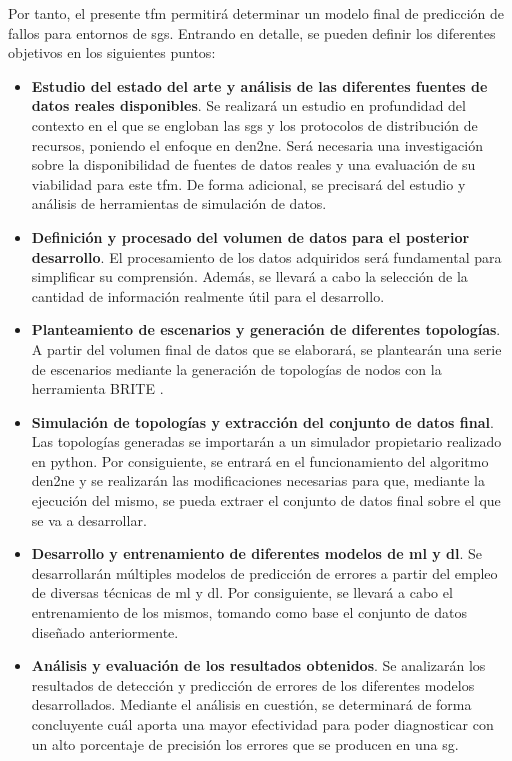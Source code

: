 \vspace{3mm}

\pagebreak

Por tanto, el presente \gls{tfm} permitirá determinar un modelo final de predicción de fallos para entornos de \gls{sg}s. Entrando en detalle, se pueden definir los diferentes objetivos en los siguientes puntos:

\begin{itemize}
    \item \textbf{Estudio del estado del arte y análisis de las diferentes fuentes de datos reales disponibles}. Se realizará un estudio en profundidad del contexto en el que se engloban las \gls{sg}s y los protocolos de distribución de recursos, poniendo el enfoque en \gls{den2ne}. Será necesaria una investigación sobre la disponibilidad de fuentes de datos reales y una evaluación de su viabilidad para este \gls{tfm}. De forma adicional, se precisará del estudio y análisis de herramientas de simulación de datos.
    
    \item \textbf{Definición y procesado del volumen de datos para el posterior desarrollo}. El procesamiento de los datos adquiridos será fundamental para simplificar su comprensión. Además, se llevará a cabo la selección de la cantidad de información realmente útil para el desarrollo.    

    \item \textbf{Planteamiento de escenarios y generación de diferentes topologías}. A partir del volumen final de datos que se elaborará, se plantearán una serie de escenarios mediante la generación de topologías de nodos con la herramienta BRITE \cite{brite}.
    
    \item \textbf{Simulación de topologías y extracción del conjunto de datos final}. Las topologías generadas se importarán a un simulador propietario realizado en python. Por consiguiente, se entrará en el funcionamiento del algoritmo \gls{den2ne} y se realizarán las modificaciones necesarias para que, mediante la ejecución del mismo, se pueda extraer el conjunto de datos final sobre el que se va a desarrollar.
    
    \item \textbf{Desarrollo y entrenamiento de diferentes modelos de \gls{ml} y \gls{dl}}. Se desarrollarán múltiples modelos de predicción de errores a partir del empleo de diversas técnicas de \gls{ml} y \gls{dl}. Por consiguiente, se llevará a cabo el entrenamiento de los mismos, tomando como base el conjunto de datos diseñado anteriormente. 
    
    \item \textbf{Análisis y evaluación de los resultados obtenidos}. Se analizarán los resultados de detección y predicción de errores de los diferentes modelos desarrollados. Mediante el análisis en cuestión, se determinará de forma concluyente cuál aporta una mayor efectividad para poder diagnosticar con un alto porcentaje de precisión los errores que se producen en una \gls{sg}.
    
\end{itemize}

